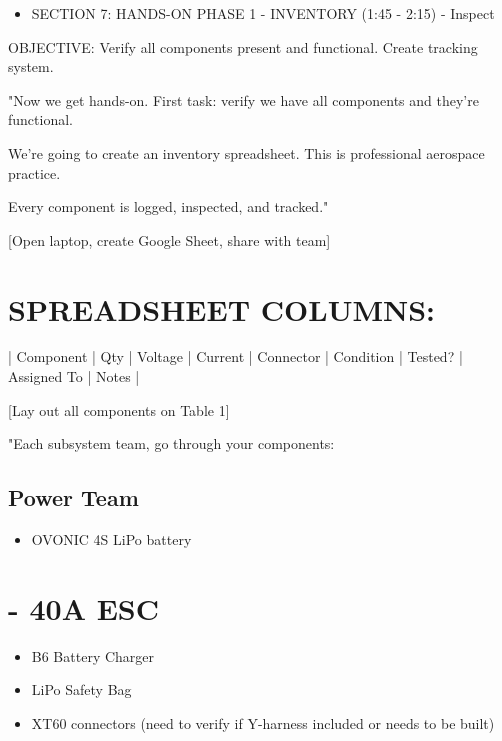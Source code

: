 \documentclass[11pt,letterpaper]{article}
\begin{document}
{\begin{itemize}
  \item SECTION 7: HANDS-ON PHASE 1 - INVENTORY (1:45 - 2:15) - Inspect
\end{itemize}

OBJECTIVE: Verify all components present and functional. Create tracking system.\par

"Now we get hands-on. First task: verify we have all components and they're functional.\par

We're going to create an inventory spreadsheet. This is professional aerospace practice.\par

Every component is logged, inspected, and tracked."\par

[Open laptop, create Google Sheet, share with team]\par

\section{SPREADSHEET COLUMNS:}

| Component | Qty | Voltage | Current | Connector | Condition | Tested? | Assigned To | Notes |\par

[Lay out all components on Table 1]\par

"Each subsystem team, go through your components:\par

\subsection{Power Team}

\begin{itemize}
  \item OVONIC 4S LiPo battery
\end{itemize}

\section{- 40A ESC}

\begin{itemize}
  \item B6 Battery Charger
  \item LiPo Safety Bag
  \item XT60 connectors (need to verify if Y-harness included or needs to be built)
\end{itemize}

}
\end{document}
